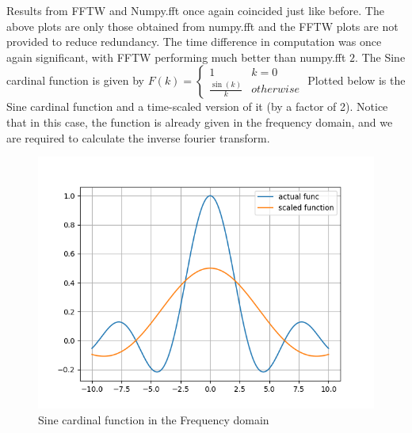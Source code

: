 \documentclass[12pt]{article}
\begin{document}
Results from FFTW and Numpy.fft once again coincided just like before. The above plots are only those obtained from numpy.fft and the FFTW plots are not provided to reduce redundancy. The time difference in computation was once again significant, with FFTW performing much better than numpy.fft 
\newpage 
$2.$ The Sine cardinal function is given by $F(k)= \begin{cases}
1 & k=0 \\
\frac{\sin(k)}{k} & otherwise
\end{cases}$
Plotted below is the Sine cardinal function and a time-scaled version of it (by a factor of 2).
Notice that in this case, the function is already given in the frequency domain, and we are required to calculate the inverse fourier transform. 
\begin{figure}[h]
	\centering
	\includegraphics[scale=0.40]{2/space_domain-sinecardinal.png}
	\caption{Sine cardinal function in the Frequency domain}
\end{figure}
\end{document}
